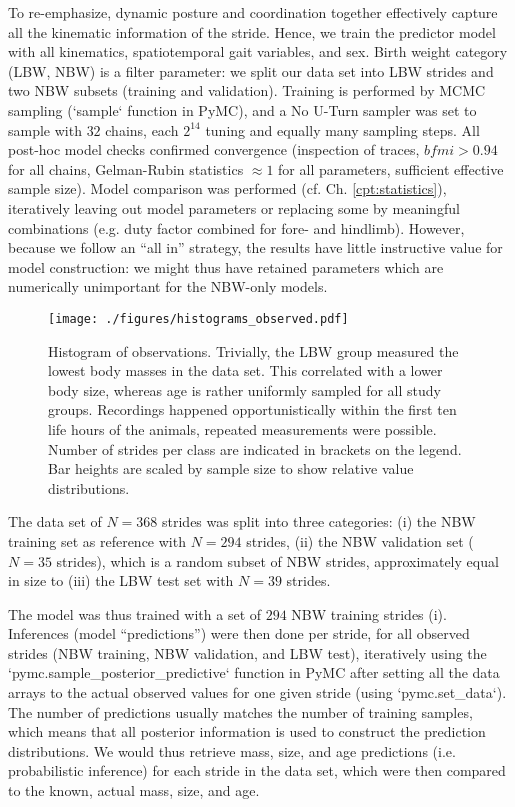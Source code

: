 To re-emphasize, dynamic posture and coordination together effectively capture all the kinematic information of the stride.
Hence, we train the predictor model with all kinematics, spatiotemporal gait variables, and sex.
Birth weight category (LBW, NBW) is a filter parameter: we split our data set into LBW strides and two NBW subsets (training and validation).
Training is performed by MCMC sampling (`sample` function in PyMC), and a No U-Turn sampler was set to sample with \(32\) chains, each \(2^{14}\) tuning and equally many sampling steps.
All post-hoc model checks confirmed convergence (inspection of traces, \(bfmi>0.94\) for all chains, Gelman-Rubin statistics \(\approx 1\) for all parameters, sufficient effective sample size).
Model comparison was performed (cf. Ch. \ref{cpt:statistics}), iteratively leaving out model parameters or replacing some by meaningful combinations (e.g. duty factor combined for fore- and hindlimb).
However, because we follow an ``all in'' strategy, the results have little instructive value for model construction: we might thus have retained parameters which are numerically unimportant for the NBW-only models.



\begin{figure}[p]
\centering
\texttt{[image: ./figures/histograms\_observed.pdf]}
\caption{\label{fig:observations}Histogram of observations. Trivially, the LBW group measured the lowest body masses in the data set. This correlated with a lower body size, whereas age is rather uniformly sampled for all study groups. Recordings happened opportunistically within the first ten life hours of the animals, repeated measurements were possible. Number of strides per class are indicated in brackets on the legend. Bar heights are scaled by sample size to show relative value distributions.}
\end{figure}


The data set of \(N = 368\) strides was split into three categories:
(i) the NBW training set as reference with \(N = 294\) strides,
(ii) the NBW validation set (\(N = 35\) strides), which is a random subset of NBW strides, approximately equal in size to
(iii) the LBW test set with \(N = 39\) strides.

The model was thus trained with a set of \(294\) NBW training strides (i).
Inferences (model ``predictions'') were then done per stride, for all observed strides (NBW training, NBW validation, and LBW test), iteratively using the `pymc.sample\_posterior\_predictive` function in PyMC after setting all the data arrays to the actual observed values for one given stride (using `pymc.set\_data`).
The number of predictions usually matches the number of training samples, which means that all posterior information is used to construct the prediction distributions.
We would thus retrieve mass, size, and age predictions (i.e. probabilistic inference) for each stride in the data set, which were then compared to the known, actual mass, size, and age.


